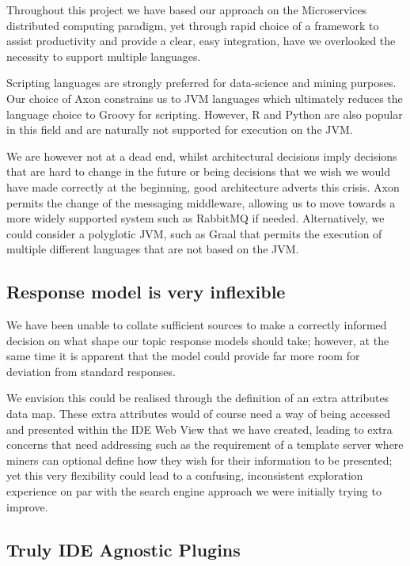 Throughout this project we have based our approach on the Microservices distributed computing paradigm, yet through rapid choice of a framework to assist productivity and provide a clear, easy integration, have we overlooked the necessity to support multiple languages.

Scripting languages are strongly preferred for data-science and mining purposes. Our choice of Axon constrains us to JVM languages which ultimately reduces the language choice to Groovy for scripting. However, R and Python are also popular in this field and are naturally not supported for execution on the JVM. 

We are however not at a dead end, whilst architectural decisions imply decisions that are hard to change in the future or being decisions that we wish we would have made correctly at the beginning, good architecture adverts this crisis. Axon permits the change of the messaging middleware, allowing us to move towards a more widely supported system such as RabbitMQ if needed. Alternatively, we could consider a polyglotic JVM, such as Graal that permits the execution of multiple different languages that are not based on the JVM.

\subsection{Response model is very inflexible}

We have been unable to collate sufficient sources to make a correctly informed decision on what shape our topic response models should take; however, at the same time it is apparent that the model could provide far more room for deviation from standard responses. 

We envision this could be realised through the definition of an extra attributes data map. These extra attributes would of course need a way of being accessed and presented within the IDE Web View that we have created, leading to extra concerns that need addressing such as the requirement of a template server where miners can optional define how they wish for their information to be presented; yet this very flexibility could lead to a confusing, inconsistent exploration experience on par with the search engine approach we were initially trying to improve.

\subsection{Truly IDE Agnostic Plugins}

